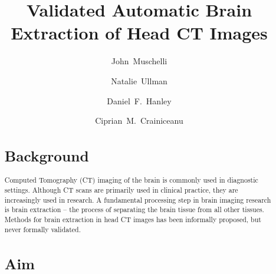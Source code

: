 \documentclass{elsarticle}\usepackage[]{graphicx}\usepackage[]{color}
\begin{document}
\renewcommand{\thesubfigure}{\Alph{subfigure}}

\begin{frontmatter}

\date{}

\title{Validated Automatic Brain Extraction of Head CT Images}

% 
% 
% 
% 
% 


\author[jhsph]{John~Muschelli}

\author[jhmi]{Natalie~Ullman}

\author[jhmi]{Daniel~F.~Hanley}

\author[jhsph]{Ciprian~M.~Crainiceanu}


\address[jhsph]{Department of Biostatistics, Bloomberg School of Public Health, Johns Hopkins University, Baltimore, MD, USA}
\address[jhmi]{Department of Neurology, Division of Brain Injury Outcomes,  Johns Hopkins Medical Institutions, Baltimore, MD, USA}


\begin{abstract}
\section*{Background}
Computed Tomography (CT) imaging of the brain is commonly used in diagnostic settings.  Although CT scans are primarily used in clinical practice, they are increasingly used in research.  A fundamental processing step in brain imaging research is brain extraction -- the process of separating the brain tissue from all other tissues. Methods for brain extraction in head CT images has been informally proposed, but never formally validated.


\section*{Aim}


\end{abstract}
\end{frontmatter}
\end{document}
